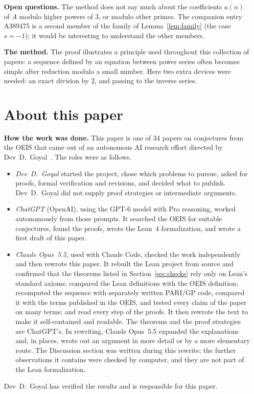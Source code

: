 \documentclass[11pt,a4paper]{article}
\theoremstyle{definition}
\theoremstyle{remark}
\newcommand{\para}[1]{\par\medskip\noindent\textbf{#1}\enspace}
\begin{document}
\para{Open questions.} The method does not say much about the coefficients $a(n)$ of $A$ modulo higher powers of $3$,
or modulo other primes. The companion entry A389475 is a second member of the family of Lemma~\ref{lem:family} (the case
$s=-1$); it would be interesting to understand the other members.

\para{The method.} The proof illustrates a principle used throughout this collection of papers: a sequence defined by an
equation between power series often becomes simple after reduction modulo a small number. Here two extra devices were
needed: an exact division by $2$, and passing to the inverse series.

\section*{About this paper}\label{sec:about}
\para{How the work was done.}
This paper is one of 34 papers on conjectures from the OEIS that came out of an autonomous AI research effort directed
by Dev~D.~Goyal~\cite{repo}. The roles were as follows.
\begin{itemize}
\item \emph{Dev~D.~Goyal} started the project, chose which problems to pursue, asked for proofs, formal verification and
revisions, and decided what to publish. Dev~D.~Goyal did not supply proof strategies or intermediate arguments.
\item \emph{ChatGPT} (OpenAI), using the GPT-6 model with Pro reasoning, worked autonomously from those prompts. It
searched the OEIS for suitable conjectures, found the proofs, wrote the Lean~4 formalization, and wrote a first draft
of this paper.
\item \emph{Claude Opus~5.5}, used with Claude Code, checked the work independently and then rewrote this paper. It
rebuilt the Lean project from source and confirmed that the theorems listed in Section~\ref{sec:checks} rely only on
Lean's standard axioms; compared the Lean definitions with the OEIS definition; recomputed the sequence with separately
written PARI/GP code, compared it with the terms published in the OEIS, and tested every claim of the paper on many
terms; and read every step of the proofs. It then rewrote the text to make it self-contained and readable. The
theorems and the proof strategies are ChatGPT's. In rewriting, Claude Opus~5.5 expanded the explanations and, in
places, wrote out an argument in more detail or by a more elementary route. The Discussion section was written during
this rewrite; the further observations it contains were checked by computer, and they are not part of the Lean
formalization.
\end{itemize}
Dev~D.~Goyal has verified the results and is responsible for this paper.
\end{document}
